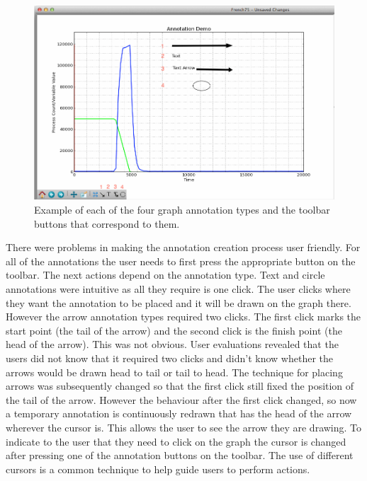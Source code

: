 \begin{figure}[h!]
    \centering
    \includegraphics[width=\textwidth]{images/annotation_demo.png}
    \caption{Example of each of the four graph annotation types and the toolbar buttons that correspond to them.}
    \label{fig:annotation_demo}
\end{figure}

There were problems in making the annotation creation process user friendly.  For all of the annotations the user needs to first press the appropriate button on the toolbar.  The next actions depend on the annotation type.  Text and circle annotations were intuitive as all they require is one click.  The user clicks where they want the annotation to be placed and it will be drawn on the graph there.  However the arrow annotation types required two clicks.  The first click marks the start point (the tail of the arrow) and the second click is the finish point (the head of the arrow).  This was not obvious. User evaluations revealed that the users did not know that it required two clicks and didn't know whether the arrows would be drawn head to tail or tail to head.  The technique for placing arrows was subsequently changed so that the first click still fixed the position of the tail of the arrow. However the behaviour after the first click changed, so now a temporary annotation is continuously redrawn that has the head of the arrow wherever the cursor is.  This allows the user to see the arrow they are drawing.  To indicate to the user that they need to click on the graph the cursor is changed after pressing one of the annotation buttons on the toolbar.  The use of different cursors is a common technique to help guide users to perform actions.

